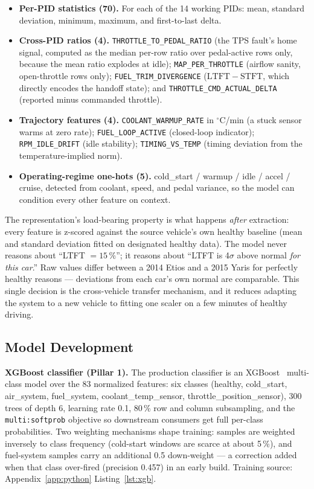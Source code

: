 \begin{itemize}
  \item \textbf{Per-PID statistics (70).} For each of the 14 working PIDs:
    mean, standard deviation, minimum, maximum, and first-to-last delta.
  \item \textbf{Cross-PID ratios (4).} \texttt{THROTTLE\_TO\_PEDAL\_RATIO}
    (the TPS fault's home signal, computed as the median per-row ratio over
    pedal-active rows only, because the mean ratio explodes at idle);
    \texttt{MAP\_PER\_THROTTLE} (airflow sanity, open-throttle rows only);
    \texttt{FUEL\_TRIM\_DIVERGENCE} ($\mathrm{LTFT} - \mathrm{STFT}$, which
    directly encodes the handoff state); and
    \texttt{THROTTLE\_CMD\_ACTUAL\_DELTA} (reported minus commanded
    throttle).
  \item \textbf{Trajectory features (4).} \texttt{COOLANT\_WARMUP\_RATE} in
    $^{\circ}$C/min (a stuck sensor warms at zero rate);
    \texttt{FUEL\_LOOP\_ACTIVE} (closed-loop indicator);
    \texttt{RPM\_IDLE\_DRIFT} (idle stability);
    \texttt{TIMING\_VS\_TEMP} (timing deviation from the temperature-implied
    norm).
  \item \textbf{Operating-regime one-hots (5).} cold\_start / warmup /
    idle / accel / cruise, detected from coolant, speed, and pedal
    variance, so the model can condition every other feature on context.
\end{itemize}

The representation's load-bearing property is what happens \emph{after}
extraction: every feature is z-scored against the source vehicle's own
healthy baseline (mean and standard deviation fitted on designated healthy
data). The model never reasons about ``LTFT $= 15\,\%$''; it reasons about
``LTFT is 4$\sigma$ above normal \emph{for this car}.'' Raw values differ
between a 2014 Etios and a 2015 Yaris for perfectly healthy reasons ---
deviations from each car's own normal are comparable. This single decision
is the cross-vehicle transfer mechanism, and it reduces adapting the system
to a new vehicle to fitting one scaler on a few minutes of healthy driving.

\subsection{Model Development}
\label{sec:models}

\textbf{XGBoost classifier (Pillar 1).} The production classifier is an
XGBoost~\cite{chen2016} multi-class model over the 83 normalized features:
six classes (healthy, cold\_start, air\_system, fuel\_system,
coolant\_temp\_sensor, throttle\_position\_sensor), 300 trees of depth 6,
learning rate 0.1, 80\,\% row and column subsampling, and the
\texttt{multi:softprob} objective so downstream consumers get full
per-class probabilities. Two weighting mechanisms shape training: samples
are weighted inversely to class frequency (cold-start windows are scarce at
about 5\,\%), and fuel-system samples carry an additional 0.5 down-weight
--- a correction added when that class over-fired (precision 0.457) in an
early build. Training source: Appendix~\ref{app:python}
Listing~\ref{lst:xgb}.

